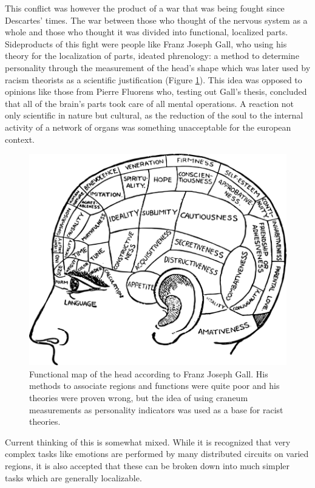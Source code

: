 This conflict was however the product of a war that was being fought since Descartes' times. The war between those who thought of the nervous system as a whole and those who thought it was divided into functional, localized parts. Sideproducts of this fight were people like Franz Joseph Gall, who using his theory for the localization of parts, ideated phrenology: a method to determine personality through the measurement of the head's shape which was later used by racism theorists as a scientific justification (Figure \ref{gall}). This idea was opposed to opinions like those from Pierre Fluorens who, testing out Gall's thesis, concluded that all of the brain's parts took care of all mental operations. A reaction not only scientific in nature but cultural, as the reduction of the soul to the internal activity of a network of organs was something unacceptable for the european context.

\begin{figure}[H]
	\centering

	\includegraphics[width=\linewidth]{media/4-gall.png}
	\caption{Functional map of the head according to Franz Joseph Gall. His methods to associate regions and functions were quite poor and his theories were proven wrong, but the idea of using craneum measurements as personality indicators was used as a base for racist theories.}
	\label{gall}
\end{figure}

Current thinking of this is somewhat mixed. While it is recognized that very complex tasks like emotions are performed by many distributed circuits on varied regions, it is also accepted that these can be broken down into much simpler tasks which are generally localizable.

